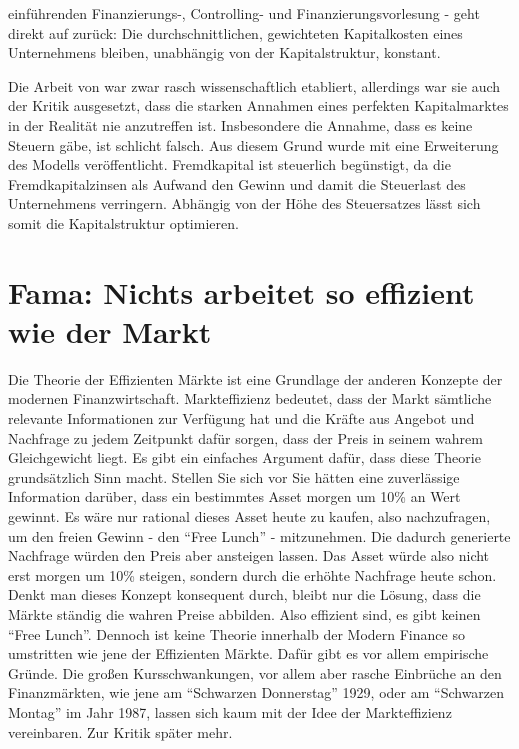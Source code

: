 einführenden Finanzierungs-, Controlling- und Finanzierungsvorlesung - geht direkt auf \textcite{Modigliani1958} zurück: Die durchschnittlichen, gewichteten Kapitalkosten eines Unternehmens bleiben, unabhängig von der Kapitalstruktur, konstant.

Die Arbeit von \textcite{Modigliani1958} war zwar rasch wissenschaftlich etabliert, allerdings war sie auch der Kritik ausgesetzt, dass die starken Annahmen eines perfekten Kapitalmarktes in der Realität nie anzutreffen ist. Insbesondere die Annahme, dass es keine Steuern gäbe, ist schlicht falsch. Aus diesem Grund wurde mit \textcite{Modigliani1963} eine Erweiterung des Modells veröffentlicht. Fremdkapital ist steuerlich begünstigt, da die Fremdkapitalzinsen als Aufwand den Gewinn und damit die Steuerlast des Unternehmens verringern. Abhängig von der Höhe des Steuersatzes lässt sich somit die Kapitalstruktur optimieren.

\section{Fama: Nichts arbeitet so effizient wie der Markt}
\label{Efficient}

Die Theorie der Effizienten Märkte ist eine Grundlage der anderen Konzepte der modernen Finanzwirtschaft. Markteffizienz bedeutet, dass der Markt sämtliche relevante Informationen zur Verfügung hat und die Kräfte aus Angebot und Nachfrage zu jedem Zeitpunkt dafür sorgen, dass der Preis in seinem wahrem Gleichgewicht liegt. Es gibt ein einfaches Argument dafür, dass diese Theorie grundsätzlich Sinn macht. Stellen Sie sich vor Sie hätten eine zuverlässige Information darüber, dass ein bestimmtes Asset morgen um 10\% an Wert gewinnt. Es wäre nur rational dieses Asset heute zu kaufen, also nachzufragen, um den freien Gewinn - den "`Free Lunch"' - mitzunehmen. Die dadurch generierte Nachfrage würden den Preis aber ansteigen lassen. Das Asset würde also nicht erst morgen um 10\% steigen, sondern durch die erhöhte Nachfrage heute schon. Denkt man dieses Konzept konsequent durch, bleibt nur die Lösung, dass die Märkte ständig die wahren Preise abbilden. Also effizient sind, es gibt keinen "`Free Lunch"'. Dennoch ist keine Theorie innerhalb der Modern Finance so umstritten wie jene der Effizienten Märkte. Dafür gibt es vor allem empirische Gründe. Die großen Kursschwankungen, vor allem aber rasche Einbrüche an den Finanzmärkten, wie jene am "`Schwarzen Donnerstag"' 1929, oder am "`Schwarzen Montag"' im Jahr 1987, lassen sich kaum mit der Idee der Markteffizienz vereinbaren. Zur Kritik später mehr.

